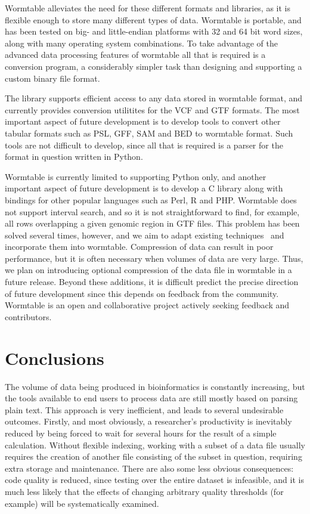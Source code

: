 \documentclass[10pt]{bmc_article}
\newenvironment{bmcformat}{\begin{raggedright}\baselineskip20pt\sloppy\setboolean{publ}{false}}{\end{raggedright}\baselineskip20pt\sloppy}
\begin{document}
\begin{bmcformat}
Wormtable alleviates the need for these different formats and libraries,
as it is flexible enough to store many different types of data. 
Wormtable is portable,
and has been tested on big- and little-endian platforms with 32 and 64
bit word sizes, along with many operating system combinations. To 
take advantage of the advanced data processing features of wormtable
all that is required is a conversion program, a considerably simpler
task than designing and supporting a custom binary file format.

The library supports efficient access to any data stored in 
wormtable format, and currently provides conversion utilitites 
for the VCF and GTF formats.
The most important aspect of future development 
is to develop tools to convert other tabular formats such as 
PSL, GFF, SAM and BED to wormtable format. 
Such tools are not difficult to develop, since all that is required is a parser
for the format in question written in Python.

Wormtable is currently limited to supporting Python only, and 
another important aspect of future development is to 
develop a C library along with bindings for other popular
languages such as Perl, R and PHP. 
Wormtable does not support interval search, and so it is not
straightforward to find, for example, all rows overlapping 
a given genomic region in GTF files. 
This problem has been 
solved several times, however, and we aim to adapt existing 
techniques~\cite{li11,kzbhk10} and incorporate them into 
wormtable.  Compression of data can
result in poor performance, but it is often necessary when 
volumes of data are very large. Thus, we plan on introducing 
optional compression of the data file in wormtable in 
a future release. Beyond these additions, it is difficult
predict the precise direction of future development since this depends 
on feedback from the community.  Wormtable is an open and 
collaborative project actively seeking feedback and 
contributors.


\section*{Conclusions}
%
The volume of data being produced in bioinformatics is constantly 
increasing, but the tools available to end users to 
process data are still mostly based on parsing plain text. This 
approach is very inefficient, and leads to several undesirable outcomes.
Firstly, and most obviously, a researcher's productivity is inevitably
reduced by being forced to wait for several hours for the result of a 
simple calculation. Without flexible indexing, working with 
a subset of a data file usually requires the creation of 
another file consisting of the subset in question, requiring 
extra storage and maintenance.
There are also some less obvious consequences:
code quality is reduced, since testing over the entire dataset is 
infeasible, and it is much less likely that the effects of 
changing arbitrary quality thresholds (for example) will be 
systematically examined.


\end{bmcformat}
\end{document}
